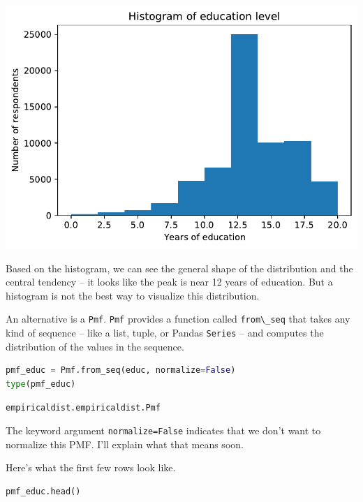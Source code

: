 \begin{center}
\includegraphics[scale=0.75]{chapters/08_distributions_files/08_distributions_36_0.pdf}
\end{center}

Based on the histogram, we can see the general shape of the distribution
and the central tendency -- it looks like the peak is near 12 years of
education. But a histogram is not the best way to visualize this
distribution.

An alternative is a \passthrough{\lstinline!Pmf!}.
\passthrough{\lstinline!Pmf!} provides a function called
\passthrough{\lstinline!from\_seq!} that takes any kind of sequence --
like a list, tuple, or Pandas \passthrough{\lstinline!Series!} -- and
computes the distribution of the values in the sequence.

\begin{lstlisting}[language=Python]
pmf_educ = Pmf.from_seq(educ, normalize=False)
type(pmf_educ)
\end{lstlisting}

\begin{lstlisting}[]
empiricaldist.empiricaldist.Pmf
\end{lstlisting}

The keyword argument \passthrough{\lstinline!normalize=False!} indicates
that we don't want to normalize this PMF. I'll explain what that means
soon.

Here's what the first few rows look like.

\begin{lstlisting}[language=Python]
pmf_educ.head()
\end{lstlisting}

